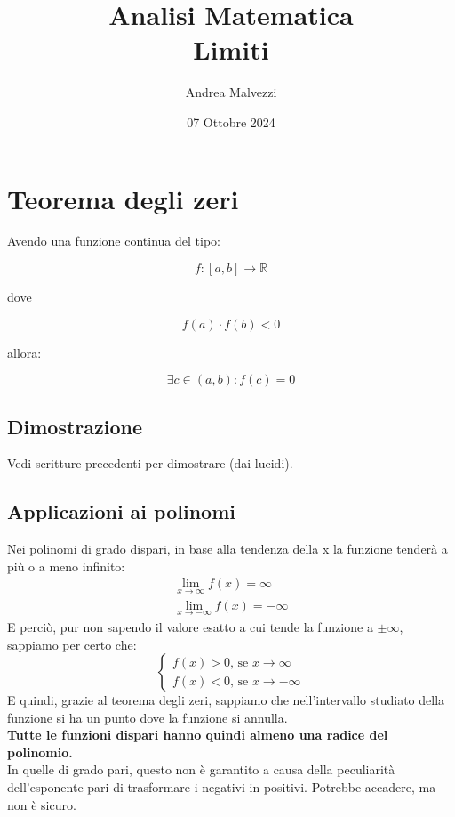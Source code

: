 \documentclass[12pt]{article}
\title{\textbf{Analisi Matematica\\Limiti}}
\date{07 Ottobre 2024}
\author{Andrea Malvezzi}
\begin{document}
\maketitle
\pagebreak
\tableofcontents
\pagebreak
\section{Teorema degli zeri}
\begin{center}
    Avendo una funzione continua del tipo:
\end{center}
\[f:[a,b] \rightarrow \mathbb{R}\]
\begin{center}
    dove
\end{center}
\[f(a) \cdot f(b) < 0\]
\begin{center}
    allora:
\end{center}
\begin{equation}
    \exists c \in (a,b) : f(c) = 0 \label{teo:zeri}
\end{equation}
\subsection{Dimostrazione}
Vedi scritture precedenti per dimostrare (dai lucidi).
\subsection{Applicazioni ai polinomi}
Nei polinomi di grado dispari, in base alla tendenza della x la funzione tenderà a più o a meno infinito:
\begin{gather*}
    \lim_{x \to \infty}{f(x)} = \infty\\
    \lim_{x \to -\infty}{f(x)} = -\infty
\end{gather*}
E perciò, pur non sapendo il valore esatto a cui tende la funzione a $\pm \infty$, sappiamo per certo che:
$$
\begin{cases}
    f(x) > 0 \text{, se } x \to \infty\\
    f(x) < 0 \text{, se } x \to -\infty
\end{cases}
$$
E quindi, grazie al teorema degli zeri, sappiamo che nell'intervallo studiato della funzione si ha un punto dove la funzione si annulla.\\
\textbf{Tutte le funzioni dispari hanno quindi almeno una radice del polinomio.}\\
In quelle di grado pari, questo non è garantito a causa della peculiarità dell'esponente pari di trasformare i negativi in positivi. Potrebbe accadere, ma non è sicuro.
\end{document}
